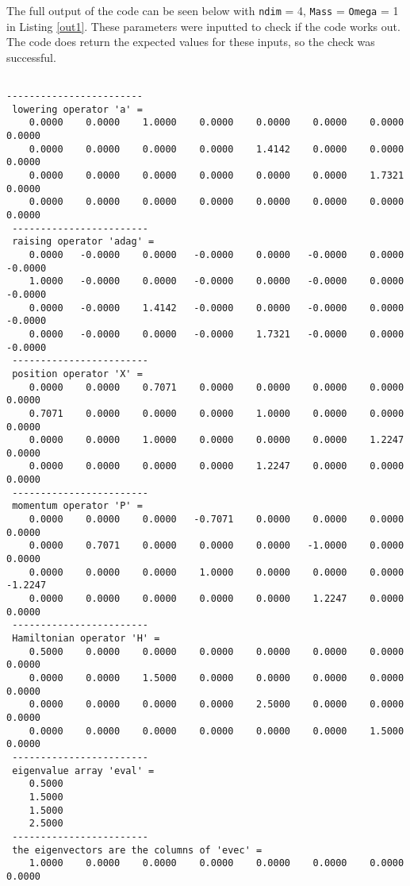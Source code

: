\documentclass[12pt]{article}
\begin{document}
The full output of the code can be seen below with {\tt ndim} = 4, {\tt Mass} = {\tt Omega} = 1 in Listing \ref{out1}.  These parameters were inputted to check if the code works out.  The code does return the expected values for these inputs, so the check was successful.  

\begin{lstlisting}[frame=single,caption={Output of {\tt Fortran 90} Code {\tt hrmosc.f90} with {\tt ndim} = 4, {\tt Mass} = {\tt Omega} = 1},label=out1]

------------------------
 lowering operator 'a' =
    0.0000    0.0000    1.0000    0.0000    0.0000    0.0000    0.0000    0.0000
    0.0000    0.0000    0.0000    0.0000    1.4142    0.0000    0.0000    0.0000
    0.0000    0.0000    0.0000    0.0000    0.0000    0.0000    1.7321    0.0000
    0.0000    0.0000    0.0000    0.0000    0.0000    0.0000    0.0000    0.0000
 ------------------------
 raising operator 'adag' =
    0.0000   -0.0000    0.0000   -0.0000    0.0000   -0.0000    0.0000   -0.0000
    1.0000   -0.0000    0.0000   -0.0000    0.0000   -0.0000    0.0000   -0.0000
    0.0000   -0.0000    1.4142   -0.0000    0.0000   -0.0000    0.0000   -0.0000
    0.0000   -0.0000    0.0000   -0.0000    1.7321   -0.0000    0.0000   -0.0000
 ------------------------
 position operator 'X' =
    0.0000    0.0000    0.7071    0.0000    0.0000    0.0000    0.0000    0.0000
    0.7071    0.0000    0.0000    0.0000    1.0000    0.0000    0.0000    0.0000
    0.0000    0.0000    1.0000    0.0000    0.0000    0.0000    1.2247    0.0000
    0.0000    0.0000    0.0000    0.0000    1.2247    0.0000    0.0000    0.0000
 ------------------------
 momentum operator 'P' =
    0.0000    0.0000    0.0000   -0.7071    0.0000    0.0000    0.0000    0.0000
    0.0000    0.7071    0.0000    0.0000    0.0000   -1.0000    0.0000    0.0000
    0.0000    0.0000    0.0000    1.0000    0.0000    0.0000    0.0000   -1.2247
    0.0000    0.0000    0.0000    0.0000    0.0000    1.2247    0.0000    0.0000
 ------------------------
 Hamiltonian operator 'H' =
    0.5000    0.0000    0.0000    0.0000    0.0000    0.0000    0.0000    0.0000
    0.0000    0.0000    1.5000    0.0000    0.0000    0.0000    0.0000    0.0000
    0.0000    0.0000    0.0000    0.0000    2.5000    0.0000    0.0000    0.0000
    0.0000    0.0000    0.0000    0.0000    0.0000    0.0000    1.5000    0.0000
 ------------------------
 eigenvalue array 'eval' =
    0.5000
    1.5000
    1.5000
    2.5000
 ------------------------
 the eigenvectors are the columns of 'evec' =
    1.0000    0.0000    0.0000    0.0000    0.0000    0.0000    0.0000    0.0000

\end{lstlisting}
\end{document}
